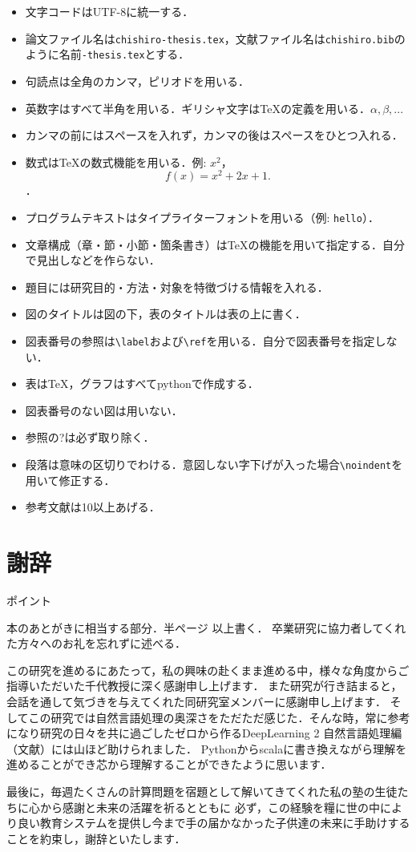 \documentclass[a4j,11pt,report]{jsbook}
\newcommand{\point}[1]{
\begin{itembox}[l]{ポイント}
  #1
\end{itembox}
}
\begin{document}
\begin{itemize}
  \item 文字コードはUTF-8に統一する．
  \item 論文ファイル名は\texttt{chishiro-thesis.tex}，文献ファイル名は\texttt{chishiro.bib}のように名前\texttt{-thesis.tex}とする．
  \item 句読点は全角のカンマ，ピリオドを用いる．
  \item 英数字はすべて半角を用いる．ギリシャ文字は{\TeX}の定義を用いる．$\alpha, \beta, ...$
  \item カンマの前にはスペースを入れず，カンマの後はスペースをひとつ入れる．
  \item 数式は{\TeX}の数式機能を用いる．例: $x^2$，\[f(x) = x^2 + 2x + 1.\]．
  \item プログラムテキストはタイプライターフォントを用いる（例: \texttt{hello}）．
  \item 文章構成（章・節・小節・箇条書き）は{\TeX}の機能を用いて指定する．自分で見出しなどを作らない．
  \item 題目には研究目的・方法・対象を特徴づける情報を入れる．
  \item 図のタイトルは図の下，表のタイトルは表の上に書く．
  \item 図表番号の参照は\verb#\label#および\verb#\ref#を用いる．自分で図表番号を指定しない．
  \item 表は{\TeX}，グラフはすべてpythonで作成する．
  \item 図表番号のない図は用いない．
  \item 参照の?は必ず取り除く．
  \item 段落は意味の区切りでわける．意図しない字下げが入った場合\verb#\noindent#を用いて修正する．
  \item 参考文献は10以上あげる．
\end{itemize}
\fi


\chapter*{謝辞 \label{ch:acknowledgement}}
\thispagestyle{empty}
\if
\point{
本のあとがきに相当する部分．半ページ 以上書く．
卒業研究に協力者してくれた方々へのお礼を忘れずに述べる．
}
\fi
この研究を進めるにあたって，私の興味の赴くまま進める中，様々な角度からご指導いただいた千代教授に深く感謝申し上げます．
また研究が行き詰まると，会話を通して気づきを与えてくれた同研究室メンバーに感謝申し上げます．
そしてこの研究では自然言語処理の奥深さをただただ感じた．そんな時，常に参考になり研究の日々を共に過ごしたゼロから作るDeepLearning 2 自然言語処理編（文献\cite{ZeroDeep}）には山ほど助けられました．
Pythonからscalaに書き換えながら理解を進めることができ芯から理解することができたように思います．

最後に，毎週たくさんの計算問題を宿題として解いてきてくれた私の塾の生徒たちに心から感謝と未来の活躍を祈るとともに
必ず，この経験を糧に世の中により良い教育システムを提供し今まで手の届かなかった子供達の未来に手助けすることを約束し，謝辞といたします．



\end{document}
